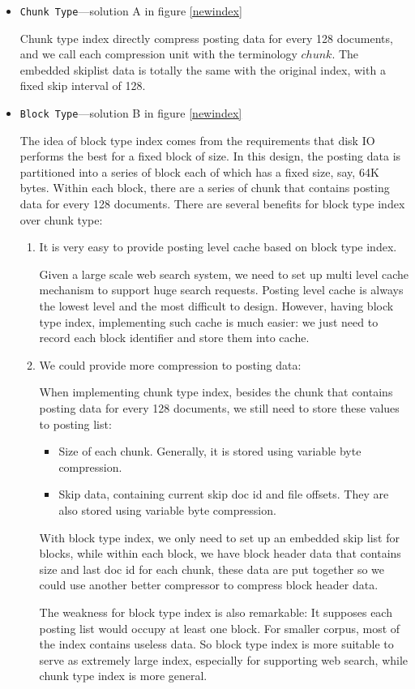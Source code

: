 \begin{itemize}
 \item \texttt{Chunk Type}---solution A in figure \ref{newindex}\par
Chunk type index directly compress posting data for every 128 documents, and we call each compression unit with the terminology $chunk$. The embedded skiplist data is totally 
the same with the original index, with a fixed skip interval of 128.

 \item \texttt{Block Type}---solution B in figure \ref{newindex} \par
The idea of block type index comes from the requirements that disk IO performs the best for a fixed block of size. In this design, the posting data is partitioned into a series of
block each of which has a fixed size, say, 64K bytes. Within each block, there are a series of chunk that contains posting data for every 128 documents. There are several
benefits for block type index over chunk type:
\begin{enumerate}
 \item It is very easy to provide posting level cache based on block type index. \par
Given a large scale web search system, we need to set up multi level cache mechanism to support huge search requests. Posting level cache is always the lowest level and the most
difficult to design. However, having block type index, implementing such cache is much easier: we just need to record each block identifier and store them into cache.
 \item We could provide more compression to posting data: \par
When implementing chunk type index, besides the chunk that contains posting data for every 128 documents, we still need to store these values to posting list:
\begin{itemize}
 \item Size of each chunk. Generally, it is stored using variable byte compression.
 \item Skip data, containing current skip doc id and file offsets. They are also stored using variable byte compression.
\end{itemize}
With block type index, we only need to set up an embedded skip list for blocks, while within each block, we have block header data that contains size and last doc id for each chunk,
these data are put together so we could use another better compressor to compress block header data.

The weakness for block type index is also remarkable: It supposes each posting list would occupy at least one block. For smaller corpus, most of the index contains useless data.
So block type index is more suitable to serve as extremely large index, especially for supporting web search, while chunk type index is more general.  
\end{enumerate}
 
\end{itemize}


